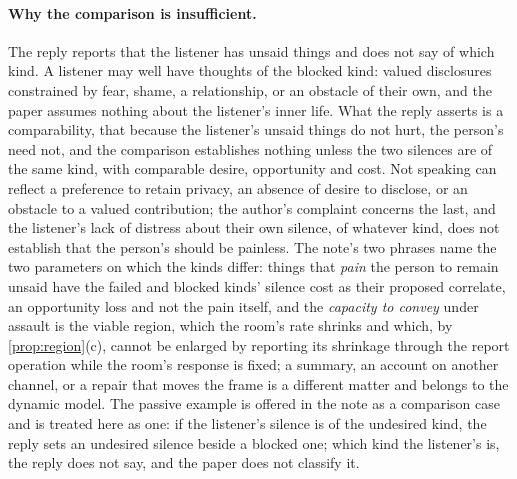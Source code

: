 \paragraph{Why the comparison is insufficient.} The reply reports that the listener has unsaid things and does not say of which kind. A listener may well have thoughts of the blocked kind: valued disclosures constrained by fear, shame, a relationship, or an obstacle of their own, and the paper assumes nothing about the listener's inner life. What the reply asserts is a comparability, that because the listener's unsaid things do not hurt, the person's need not, and the comparison establishes nothing unless the two silences are of the same kind, with comparable desire, opportunity and cost. Not speaking can reflect a preference to retain privacy, an absence of desire to disclose, or an obstacle to a valued contribution; the author's complaint concerns the last, and the listener's lack of distress about their own silence, of whatever kind, does not establish that the person's should be painless. The note's two phrases name the two parameters on which the kinds differ: things that \emph{pain} the person to remain unsaid have the failed and blocked kinds' silence cost as their proposed correlate, an opportunity loss and not the pain itself, and the \emph{capacity to convey} under assault is the viable region, which the room's rate shrinks and which, by \autoref{prop:region}(c), cannot be enlarged by reporting its shrinkage through the report operation while the room's response is fixed; a summary, an account on another channel, or a repair that moves the frame is a different matter and belongs to the dynamic model. The passive example is offered in the note as a comparison case and is treated here as one: if the listener's silence is of the undesired kind, the reply sets an undesired silence beside a blocked one; which kind the listener's is, the reply does not say, and the paper does not classify it.
